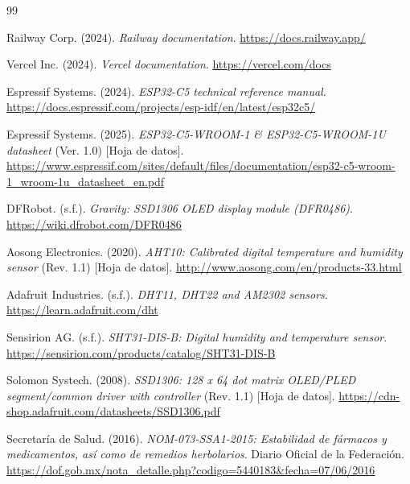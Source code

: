 \begin{thebibliography}{99}

    Railway Corp. (2024). \textit{Railway documentation}.
    \url{https://docs.railway.app/}

    Vercel Inc. (2024). \textit{Vercel documentation}.
    \url{https://vercel.com/docs}


    Espressif Systems. (2024). \textit{ESP32-C5 technical reference manual}.
    \url{https://docs.espressif.com/projects/esp-idf/en/latest/esp32c5/}

    Espressif Systems. (2025). \textit{ESP32-C5-WROOM-1 \& ESP32-C5-WROOM-1U datasheet}
    (Ver. 1.0) [Hoja de datos].
    \url{https://www.espressif.com/sites/default/files/documentation/esp32-c5-wroom-1_wroom-1u_datasheet_en.pdf}

    DFRobot. (s.f.). \textit{Gravity: SSD1306 OLED display module (DFR0486)}.
    \url{https://wiki.dfrobot.com/DFR0486}

    Aosong Electronics. (2020). \textit{AHT10: Calibrated digital temperature and humidity sensor}
    (Rev. 1.1) [Hoja de datos].
    \url{http://www.aosong.com/en/products-33.html}

    Adafruit Industries. (s.f.). \textit{DHT11, DHT22 and AM2302 sensors}.
    \url{https://learn.adafruit.com/dht}

    Sensirion AG. (s.f.). \textit{SHT31-DIS-B: Digital humidity and temperature sensor}.
    \url{https://sensirion.com/products/catalog/SHT31-DIS-B}

    Solomon Systech. (2008). \textit{SSD1306: 128 x 64 dot matrix OLED/PLED segment/common
    driver with controller} (Rev. 1.1) [Hoja de datos].
    \url{https://cdn-shop.adafruit.com/datasheets/SSD1306.pdf}


    Secretaría de Salud. (2016). \textit{NOM-073-SSA1-2015: Estabilidad de fármacos y
    medicamentos, así como de remedios herbolarios}. Diario Oficial de la Federación.
    \url{https://dof.gob.mx/nota_detalle.php?codigo=5440183&fecha=07/06/2016}


\end{thebibliography}
